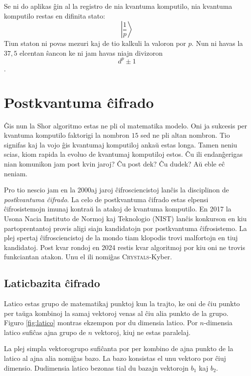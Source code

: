 \documentclass[utf8]{scrartcl}
\begin{document}
Se ni do aplikas ĝin al la registro de nia kvantuma komputilo, nia kvantuma
komputilo restas en difinita stato:
\[\left|\frac{1}{p}\right>\]
%
Tiun staton ni povas mezuri kaj de tio kalkuli la valoron por $p$. Nun ni havas
la $37,5$ elcentan ŝancon ke ni jam havas niajn divizoron
\[d^p \pm 1\].

\section{Postkvantuma ĉifrado}

Ĝis nun la Shor algoritmo estas ne pli ol matematika modelo. Oni ja sukcesis
per kvantuma komputilo faktorigi la nombron $15$ sed ne pli altan nombron. Tio
signifas kaj la vojo ĝis kvantumaj komputiloj ankaŭ estas longa. Tamen neniu
scias, kiom rapida la evoluo de kvantumaj komputiloj estos. Ĉu ili endanĝerigas
nian komunikon jam post kvin jaroj? Ĉu post dek? Ĉu dudek? Aŭ eble eĉ neniam.

Pro tio nescio jam en la 2000aj jaroj ĉifrosciencistoj lanĉis la disciplinon de
\emph{postkvantuma ĉifrado}. La celo de postkvantuma ĉifrado estas elpensi
ĉifrosistemojn imunaj kontraŭ la atakoj de kvantuma komputilo. En 2017 la Usona
Nacia Instituto de Normoj kaj Teknologio (NIST) lanĉis konkurson en kiu
partoprentantoj provis aligi siajn kandidatojn por postkvantuma
ĉifrosistemo. La plej spertaj ĉifrosciencistoj de la mondo tiam klopodis trovi
malfortojn en tiuj kandidatoj. Post kvar rondoj en 2024 restis kvar algoritmoj
por kiu oni ne trovis funkciantan atakon. Unu el ili nomiĝas
\textsc{Crystals}-Kyber.


\subsection{Laticbazita ĉifrado}

Latico estas grupo de matematikaj punktoj kun la trajto, ke oni de ĉiu punkto
per taŭga kombinoj la samaj vektoroj venas al ĉiu alia punkto de la
grupo. Figuro \ref{fig:latico} montras ekzempon por du dimensia latico.  Por
$n$-dimensia latico sufiĉas ajna grupo de $n$ vektoroj, kiuj ne estas
paralelaj.

La plej simpla vektorogrupo sufiĉanta por per kombino de ajna punkto de la
latico al ajna alia nomiĝas bazo. La bazo konsistas el unu vektoro por ĉiuj
dimensio. Dudimensia latico bezonas tial du bazajn vektorojn $b_1$ kaj $b_2$.
\end{document}
